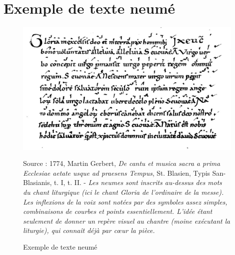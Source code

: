 \section{Exemple de texte neumé}
\label{sec:exempleTexteNeume}
\begin{figure}[H]
	\centering
	\includegraphics[keepaspectratio=true, width=\textwidth]{Annexes/i/neumes.jpg}
	\caption{Exemple de texte neumé}
	\medskip
	\small	
	Source : 1774, Martin Gerbert, \textit{De cantu et musica sacra a prima Ecclesiae aetate usque ad praesens Tempus}, St. Blasien, Typis San-Blasianis, t. I, t. II. - \it Les neumes sont inscrits au-dessus des mots du chant liturgique (ici le chant Gloria de l'ordinaire de la messe). Les inflexions de la voix sont notées par des symboles assez simples, combinaisons de courbes et points essentiellement. L'idée étant seulement de donner un repère visuel au chantre (moine exécutant la liturgie), qui connaît déjà par cœur la pièce.
	\label{fig:neumes}
\end{figure}
\clearpage

